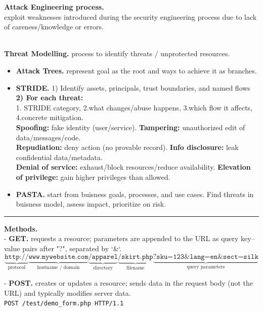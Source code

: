 \documentclass[9pt, a4paper]{extarticle}
\makeatletter
\renewcommand{\hline}{\noalign{\vskip 2px}\hrule\@height\arrayrulewidth\@width\linewidth\noalign{\vskip 2px}}
\makeatother
\begin{document}
\begin{minipage}[t]{0.495\textwidth}
\begin{minipage}[t]{0.59\textwidth}
	\end{minipage}
	\hfill
	\begin{minipage}[t]{0.39\textwidth}
		\textbf{Attack Engineering process.} \\exploit weaknesses introduced during the security engineering process due to lack of careness/knowledge or errors.
	\end{minipage}\\
	\textbf{Threat Modelling.} process to identify threats / unprotected resources.
	\begin{itemize}
		\item[-] \textbf{Attack Trees.} represent goal as the root and ways to achieve it as branches.
		\item[-] \textbf{STRIDE.} 1) Identify assets, principals, trust boundaries, and named flows \textbf{2) For each threat:} \\
		      1. STRIDE category, 2.what changes/abuse happens, 3.which flow it affects, 4.concrete mitigation.\\
		      \textbf{Spoofing:} fake identity (user/service). \textbf{Tampering:} unauthorized edit of data/messages/code.\\
		      \textbf{Repudiation:} deny action (no provable record). \textbf{Info disclosure:} leak confidential data/metadata.\\
		      \textbf{Denial of service:} exhaust/block resources/reduce availability. \textbf{Elevation of privilege:} gain higher privileges than allowed.
		\item[-] \textbf{PASTA.} start from buisness goals, processes, and use cases. Find threats in buisness model, assess impact, prioritize on risk.
	\end{itemize}
	\hline
	\textbf{Methods.}\\
	- \textbf{GET.} requests a resource; parameters are appended to the URL as query key–value pairs after "?", separated by `\&`.\\[-7px]
	\[
		\underbrace{\texttt{http://}}_{\text{protocol}}
		\underbrace{\texttt{www.mywebsite.com}}_{\text{hostname / domain}}
		\underbrace{\texttt{/apparel}}_{\text{directory}}
		\underbrace{\texttt{/skirt.php}}_{\text{filename}}
		\underbrace{\texttt{?sku=123\&lang=en\&sect=silk}}_{\text{query parameters}}
	\]
	\begin{minipage}[t]{0.44\textwidth}
		- \textbf{POST.} creates or updates a resource; sends data in the request body (not the URL) and typically modifies server data.\\
		\texttt{POST /test/demo\_form.php HTTP/1.1}\\

\end{minipage}
\end{minipage}
\end{document}
